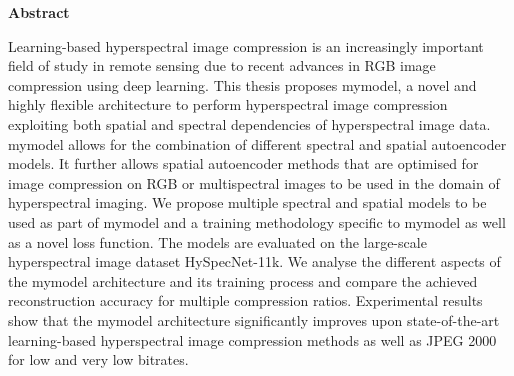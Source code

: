 \thispagestyle{empty}
\vspace*{1.4cm}

\begin{center}
    {\Large \textbf{Abstract}}
\end{center}

\vspace*{0.5cm}

\noindent
Learning-based hyperspectral image compression is an increasingly important field of study in remote sensing due to recent advances in RGB image compression using deep learning. This thesis proposes \ac{mymodel}, a novel and highly flexible architecture to perform hyperspectral image compression exploiting both spatial and spectral dependencies of hyperspectral image data. \ac{mymodel} allows for the combination of different spectral and spatial autoencoder models. It further allows spatial autoencoder methods that are optimised for image compression on RGB or multispectral images to be used in the domain of hyperspectral imaging. We propose multiple spectral and spatial models to be used as part of \ac{mymodel} and a training methodology specific to \ac{mymodel} as well as a novel loss function. The models are evaluated on the large-scale hyperspectral image dataset HySpecNet-11k. We analyse the different aspects of the \ac{mymodel} architecture and its training process and compare the achieved reconstruction accuracy for multiple compression ratios. Experimental results show that the \ac{mymodel} architecture significantly improves upon state-of-the-art learning-based hyperspectral image compression methods as well as JPEG 2000 for low and very low bitrates.
\\